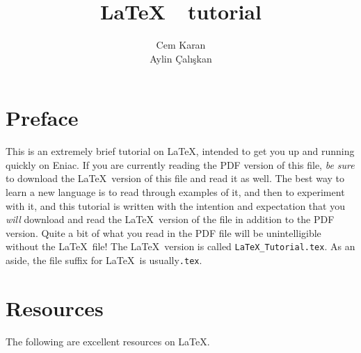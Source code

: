 \documentclass[letterpaper]{article}
\title{\LaTeX\ \ tutorial}
\author{Cem Karan\\Aylin \c{C}al{\i}\c{s}kan}
\begin{document}
\maketitle
\tableofcontents

\section*{Preface}

This is an extremely brief tutorial on \LaTeX, intended to get you up 
and running quickly on Eniac.  If you are currently reading the PDF 
version of this file, \emph{be sure} to download the \LaTeX\ version of 
this file and read it as well.  The best way to learn a new language is 
to read through examples of it, and then to experiment with it, and this 
tutorial is written with the intention and expectation that you 
\emph{will} download and read the \LaTeX\ version of the file in 
addition to the PDF version.  Quite a bit of what you read in the PDF 
file will be unintelligible without the \LaTeX\ file! The \LaTeX\ 
version is called \verb+LaTeX_Tutorial.tex+.  As an aside, the file 
suffix for \LaTeX\ is usually\verb+.tex+.

\pagebreak
\section{Resources}

The following are excellent resources on \LaTeX.
\end{document}

